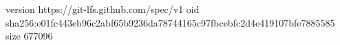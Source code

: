 version https://git-lfs.github.com/spec/v1
oid sha256:e01fc443eb96c2abf65b9236da78744165c97fbcebfc2d4e419107bfe7885585
size 677096
